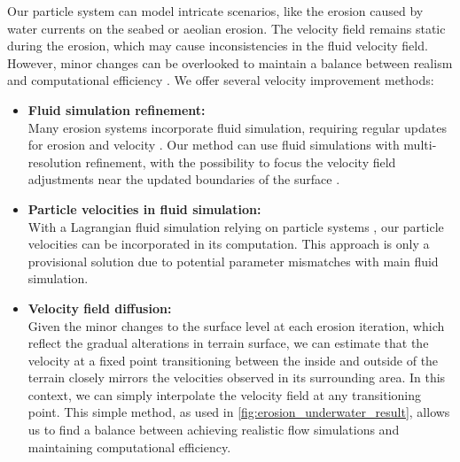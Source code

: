 Our particle system can model intricate scenarios, like the erosion caused by water currents on the seabed or aeolian erosion. The velocity field remains static during the erosion, which may cause inconsistencies in the fluid velocity field. However, minor changes can be overlooked to maintain a balance between realism and computational efficiency \cite{Tychonievich2010}. We offer several velocity improvement methods: 
\begin{itemize}
    \item \textbf{Fluid simulation refinement:} \\
Many erosion systems incorporate fluid simulation, requiring regular updates for erosion and velocity \cite{Kristof2009, Wojtan2007}. Our method can use fluid simulations with multi-resolution refinement, with the possibility to focus the velocity field adjustments near the updated boundaries of the surface \cite{Roose2011}. \\
\item \textbf{Particle velocities in fluid simulation:} \\
With a Lagrangian fluid simulation relying on particle systems \cite{Koschier2022}, our particle velocities can be incorporated in its computation. This approach is only a provisional solution due to potential parameter mismatches with main fluid simulation. \\
\item \textbf{Velocity field diffusion:} \\
Given the minor changes to the surface level at each erosion iteration, which reflect the gradual alterations in terrain surface, we can estimate that the velocity at a fixed point transitioning between the inside and outside of the terrain closely mirrors the velocities observed in its surrounding area. In this context, we can simply interpolate the velocity field at any transitioning point. This simple method, as used in \cref{fig:erosion_underwater_result}, allows us to find a balance between achieving realistic flow simulations and maintaining computational efficiency.
\end{itemize}
